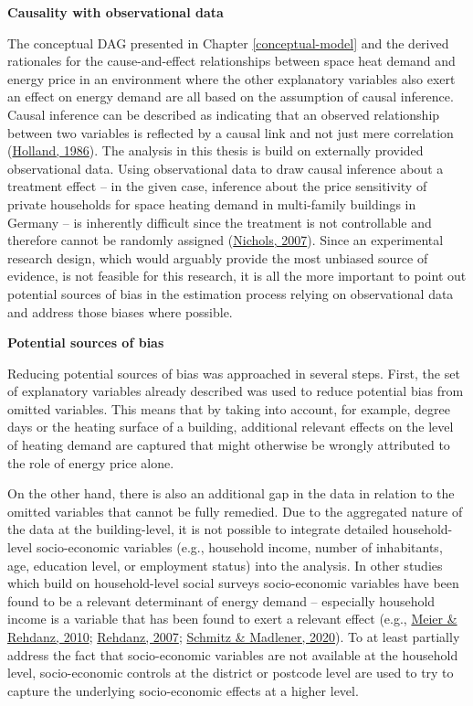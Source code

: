 \documentclass[12pt,twoside]{reedthesis}
\begin{document}
\textbf{Causality with observational data}

The conceptual DAG presented in Chapter \ref{conceptual-model} and the derived rationales for the cause-and-effect relationships between space heat demand and energy price in an environment where the other explanatory variables also exert an effect on energy demand are all based on the assumption of causal inference. Causal inference can be described as indicating that an observed relationship between two variables is reflected by a causal link and not just mere correlation (\protect\hyperlink{ref-holland86}{Holland, 1986}). The analysis in this thesis is build on externally provided observational data. Using observational data to draw causal inference about a treatment effect -- in the given case, inference about the price sensitivity of private households for space heating demand in multi-family buildings in Germany -- is inherently difficult since the treatment is not controllable and therefore cannot be randomly assigned (\protect\hyperlink{ref-nichols07}{Nichols, 2007}). Since an experimental research design, which would arguably provide the most unbiased source of evidence, is not feasible for this research, it is all the more important to point out potential sources of bias in the estimation process relying on observational data and address those biases where possible.

\textbf{Potential sources of bias}

Reducing potential sources of bias was approached in several steps. First, the set of explanatory variables already described was used to reduce potential bias from omitted variables. This means that by taking into account, for example, degree days or the heating surface of a building, additional relevant effects on the level of heating demand are captured that might otherwise be wrongly attributed to the role of energy price alone.

On the other hand, there is also an additional gap in the data in relation to the omitted variables that cannot be fully remedied. Due to the aggregated nature of the data at the building-level, it is not possible to integrate detailed household-level socio-economic variables (e.g., household income, number of inhabitants, age, education level, or employment status) into the analysis. In other studies which build on household-level social surveys socio-economic variables have been found to be a relevant determinant of energy demand -- especially household income is a variable that has been found to exert a relevant effect (e.g., \protect\hyperlink{ref-meier_rehdanz10}{Meier \& Rehdanz, 2010}; \protect\hyperlink{ref-rehdanz07}{Rehdanz, 2007}; \protect\hyperlink{ref-schmitz_madlener20}{Schmitz \& Madlener, 2020}). To at least partially address the fact that socio-economic variables are not available at the household level, socio-economic controls at the district or postcode level are used to try to capture the underlying socio-economic effects at a higher level.
\end{document}
